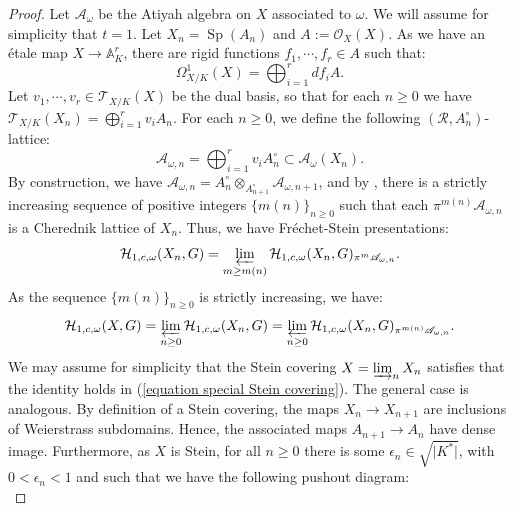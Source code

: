 \documentclass{amsart}
\newcommand{\Sp}{\operatorname{Sp}}
\newcommand{\OX}{\mathcal{O}}
\begin{document}
\begin{proof}
Let $\mathcal{A}_{\omega}$ be the Atiyah algebra on $X$ associated to $\omega$. We will assume for simplicity that $t=1$. Let $X_n=\Sp(A_n)$ and $A:=\OX_X(X)$. As we have an étale map $X\rightarrow \mathbb{A}^r_K$, there are rigid functions $f_1,\cdots,f_r\in A$  such that:
\begin{equation*}
    \Omega^1_{X/K}(X)=\bigoplus_{i=1}^rdf_iA.
\end{equation*}
Let $v_1,\cdots,v_r\in \mathcal{T}_{X/K}(X)$ be the dual basis, so that for each $n\geq 0$ we have $\mathcal{T}_{X/K}(X_n)=\bigoplus_{i=1}^rv_iA_n$. For each $n\geq 0$, we define the following $(\mathcal{R}, A^{\circ}_n)$-lattice:
\begin{equation*}
    \mathscr{A}_{\omega,n}=\bigoplus_{i=1}^rv_iA^{\circ}_n\subset \mathcal{A}_{\omega}(X_n).
\end{equation*}
By construction, we have 
$\mathscr{A}_{\omega,n}=A^{\circ}_n\otimes_{A^{\circ}_{n+1}}\mathscr{A}_{\omega,n+1}$, and by \cite[Lemma 4.3.7]{p-adicCheralg}, there is a strictly increasing sequence of positive integers $\{m(n) \}_{n\geq 0}$
such that each $\pi^{m(n)}\mathscr{A}_{\omega,n}$ is a Cherednik lattice of $X_n$. Thus, we have Fréchet-Stein presentations: 
\begin{equation*}
    \mathcal{H}_{1,c,\omega}(X_n,G)=\varprojlim_{m\geq m(n)} \mathcal{H}_{1,c,\omega}(X_n,G)_{\pi^m\mathscr{A}_{\omega,n}}.
\end{equation*}
As the sequence $\{m(n) \}_{n\geq 0}$ is strictly increasing, we have:
\begin{equation*}
    \mathcal{H}_{1,c,\omega}(X,G)=\varprojlim_{n\geq 0}\mathcal{H}_{1,c,\omega}(X_n,G)=\varprojlim_{n\geq 0}\mathcal{H}_{1,c,\omega}(X_n,G)_{\pi^{m(n)}\mathscr{A}_{\omega,n}}.
\end{equation*}
We may assume for simplicity that the Stein covering $X=\varinjlim_n X_n$ satisfies that the identity holds in (\ref{equation special Stein covering}). The general case is analogous. By definition of a Stein covering, the maps $X_{n}\rightarrow X_{n+1}$ are inclusions of Weierstrass subdomains. Hence, the associated maps $A_{n+1}\rightarrow A_n$ have dense image. Furthermore, as $X$ is Stein, for all $n\geq 0$ there is some $\epsilon_n\in \sqrt{\vert K^*\vert}$, with $0< \epsilon_n<1$ and  such that we have the following pushout diagram:
\begin{equation*}

\end{equation*}
\end{proof}
\end{document}
